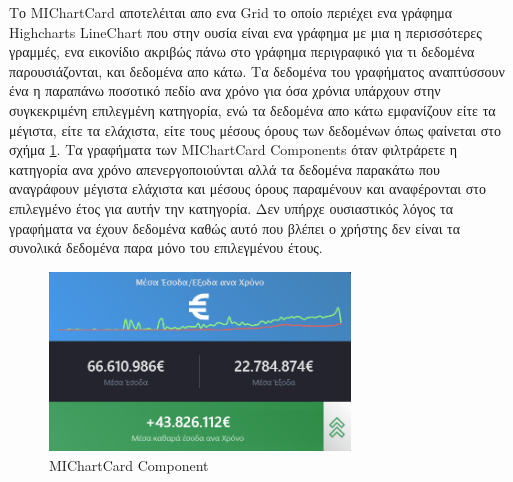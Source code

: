 Το MIChartCard αποτελέιται απο ενα Grid το οποίο περιέχει ενα γράφημα Highcharts LineChart που στην ουσία είναι ενα γράφημα με μια η περισσότερες γραμμές, ενα εικονίδιο ακριβώς πάνω στο γράφημα περιγραφικό για τι δεδομένα παρουσιάζονται, και δεδομένα απο κάτω. Τα δεδομένα του γραφήματος αναπτύσσουν ένα η παραπάνω ποσοτικό πεδίο ανα χρόνο για όσα χρόνια υπάρχουν στην συγκεκριμένη επιλεγμένη κατηγορία, ενώ τα δεδομένα απο κάτω εμφανίζουν είτε τα μέγιστα, είτε τα ελάχιστα, είτε τους μέσους όρους των δεδομένων όπως φαίνεται στο σχήμα \ref{layout:michartcard}. Τα γραφήματα των MIChartCard Components όταν φιλτράρετε η κατηγορία ανα χρόνο απενεργοποιούνται αλλά τα δεδομένα παρακάτω που αναγράφουν μέγιστα ελάχιστα και μέσους όρους παραμένουν και αναφέρονται στο επιλεγμένο έτος για αυτήν την κατηγορία. Δεν υπήρχε ουσιαστικός λόγος τα γραφήματα να έχουν δεδομένα καθώς αυτό που βλέπει ο χρήστης δεν είναι τα συνολικά δεδομένα παρα μόνο του επιλεγμένου έτους.

\begin{figure}[h]
  \centering
  \includegraphics[width=80mm]{Chapters/5 - Architecture/Client/Images/michardcard.png}
  \caption{MIChartCard Component}
  \label{layout:michartcard}
\end{figure}